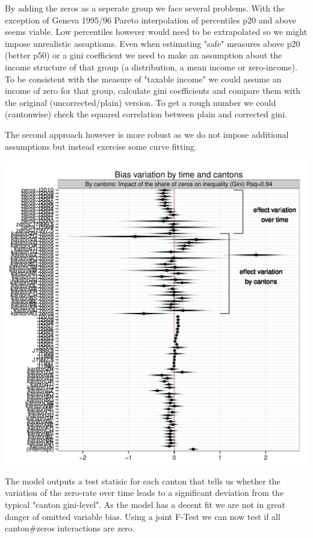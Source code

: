 \documentclass[twoside]{article}\usepackage[]{graphicx}\usepackage[]{color}
\makeatletter
\def\maxwidth{ %
  \ifdim\Gin@nat@width>\linewidth
    \linewidth
  \else
    \Gin@nat@width
  \fi
}
\newenvironment{knitrout}{}{} %
\makeatother
\begin{document}
\begin{multicols}{2}
By adding the zeros as a seperate group we face several problems. With the exception of Geneva 1995/96 Pareto interpolation of percentiles p20 and above seems viable. Low percentiles however would need to be extrapolated so we might impose unrealistic assuptioms. Even when estimating "safe" measures above p20 (better p50) or a gini coefficient we need to make an assumption about the income structure of that group (a distribution, a mean income or zero-income). To be consistent with the measure of "taxable income" we could assume an income of zero for that group, calculate gini coefficients and compare them with the original (uncorrected/plain) version. To get a rough number we could (cantonwise) check the squared correlation between plain and corrected gini.

The second approach however is more robust as we do not impose additional assumptions but instead exercise some curve fitting.

\begin{knitrout}
\color{fgcolor}
\includegraphics[width=\maxwidth]{figure/corrected_gini} 

\end{knitrout}


The model outputs a test statisic for each canton that tells us whether the variation of the zero-rate over time leads to a significant deviation from the typical "canton gini-level". As the model has a decent fit we are not in great danger of omitted variable bias. Using a joint F-Test we can now test if all canton#zeros interactions are zero. 


\end{multicols}
\end{document}
